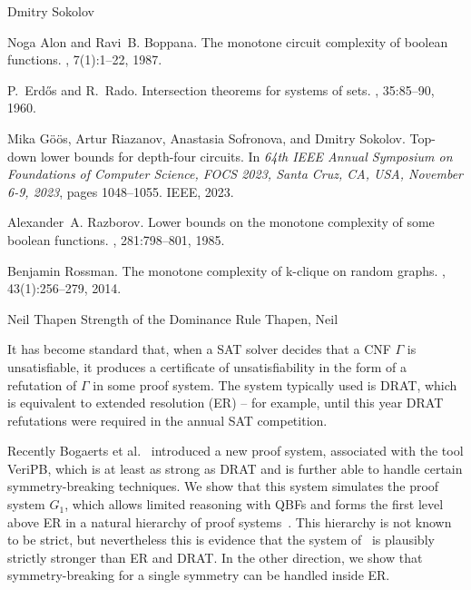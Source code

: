 \documentclass[report]{owrart}
\begin{document}
\begin{report}
\begin{talk}{Dmitry Sokolov}
\begin{thebibliography}{99}

  Noga Alon and Ravi~B. Boppana.
  \newblock The monotone circuit complexity of boolean functions.
  , 7(1):1--22, 1987.
  
  P.~Erd\H{o}s and R.~Rado.
  \newblock Intersection theorems for systems of sets.
  , 35:85--90, 1960.
  
  Mika G{\"{o}}{\"{o}}s, Artur Riazanov, Anastasia Sofronova, and Dmitry Sokolov.
  \newblock Top-down lower bounds for depth-four circuits.
  \newblock In {\em 64th {IEEE} Annual Symposium on Foundations of Computer
    Science, {FOCS} 2023, Santa Cruz, CA, USA, November 6-9, 2023}, pages
    1048--1055. {IEEE}, 2023.
  
  Alexander~A. Razborov.
  \newblock Lower bounds on the monotone complexity of some boolean functions.
  , 281:798--801, 1985.
  
  Benjamin Rossman.
  \newblock The monotone complexity of k-clique on random graphs.
  , 43(1):256--279, 2014.
  

\end{thebibliography}

\end{talk}


 \begin{talk}{Neil Thapen}
        {Strength of the Dominance Rule}
        {Thapen, Neil}
        
        \noindent
       
        It has become standard that,
when a SAT solver decides that a CNF $\Gamma$ is unsatisfiable, 
it produces a certificate of unsatisfiability in the form of a refutation of $\Gamma$ in some  proof system.
The system typically used is DRAT,
which is equivalent to extended resolution (ER)
-- for example, until this year DRAT refutations were required 
in the annual SAT competition.

Recently Bogaerts et al.~\cite{bgmn} introduced a new proof system, associated with the tool VeriPB,
which is at least as strong as DRAT 
and is further able to handle certain symmetry-breaking techniques. 
We show that this system simulates the proof system $G_1$, 
which allows limited reasoning with QBFs
and forms the first level above ER in a natural hierarchy
of proof systems~\cite{kp}. This hierarchy is not known to be strict,
but nevertheless this  is evidence that the system of~\cite{bgmn}  is plausibly
strictly stronger than ER and DRAT.
In the other direction, we show that symmetry-breaking for a single symmetry 
can be handled inside ER.


\end{talk}
\end{report}
\end{document}
